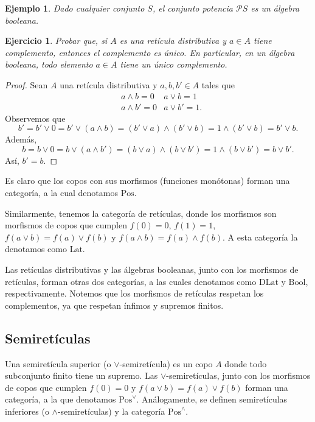 \documentclass[12pt,letterpaper,titlepage]{article}
\newtheorem{exe}{Ejercicio}
\newtheorem*{exa}{Ejemplo}
\theoremstyle{definition}
\renewcommand\sup{\vee}
\renewcommand\inf{\wedge}
\renewcommand\cal[1]{\mathcal{#1}}
\newcommand\<{\langle}
\renewcommand\>{\rangle}
\newcommand{\Pos}{\mathrm{Pos}}
\newcommand{\Lat}{\mathrm{Lat}}
\newcommand{\DLat}{\mathrm{DLat}}
\newcommand{\Bool}{\mathrm{Bool}}
\begin{document}
\begin{exa}
    Dado cualquier conjunto $S$, el conjunto potencia $\cal PS$
    es un álgebra booleana.
\end{exa}

\begin{exe}%
    \label{exe:unicidad-complemento}
  Probar que, si $A$ es una retícula distributiva y
  $a\in A$ tiene complemento, entonces el complemento es único.
  En particular, en un álgebra booleana, todo elemento $a\in A$
  tiene un único complemento.
  \label{exe:unicidad_complemento}
\end{exe}
\begin{proof}
  Sean $A$ una retícula distributiva y $a,b,b'\in A$ tales que
\begin{align*}
&a\wedge b=0 &a\vee b=1\\
&a\wedge b'=0 &a\vee b'=1.
\end{align*}
Observemos que 
\[b'=b'\vee 0=b'\vee (a \wedge b)=(b'\vee a)\wedge (b'\vee b)=1\wedge (b'\vee b)=b'\vee b.\]
Además,
\[b=b\vee 0=b\vee (a\wedge b')=(b\vee a)\wedge (b\vee b')=1\wedge (b\vee b')=b\vee b'.\]
Así, $b'=b$.
\end{proof}

Es claro que los copos con sus morfismos (funciones monótonas)
forman una categoría, a la cual denotamos $\Pos$.

Similarmente, tenemos la categoría de retículas, donde los morfismos
son morfismos de copos que cumplen $f(0)=0$, $f(1)=1$,
$f(a\sup b)=f(a)\sup f(b)$ y $f(a\inf b)=f(a)\inf f(b)$.
A esta categoría la denotamos como $\Lat$.

Las retículas distributivas y las álgebras booleanas,
junto con los morfismos de retículas,
forman otras dos categorías, a las cuales denotamos como
$\DLat$ y $\Bool$, respectivamente.
Notemos que los morfismos de retículas respetan los complementos,
ya que respetan ínfimos y supremos finitos.

\subsection{Semiretículas}
Una semiretícula superior (o $\sup$-semiretícula)
es un copo $A$ donde todo subconjunto finito tiene un supremo.
Las $\sup$-semiretículas, junto con los morfismos de copos
que cumplen $f(0)=0$ y $f(a\sup b)=f(a)\sup f(b)$ forman
una categoría, a la que denotamos $\Pos^\sup$.
Análogamente, se definen semiretículas inferiores
(o $\inf$-semiretículas) y la categoría $\Pos^\inf$.
\end{document}
